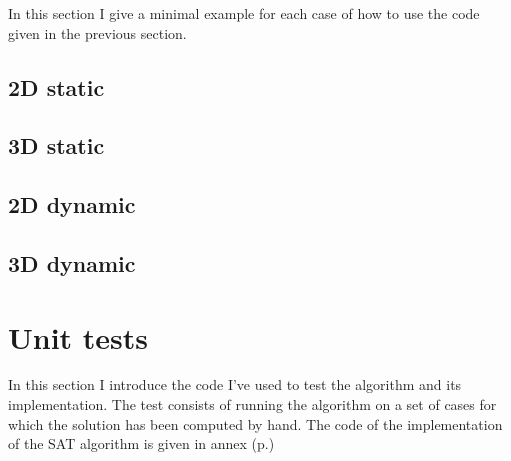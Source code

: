\documentclass[12pt, a4paper]{article}
\begin{document}
In this section I give a minimal example for each case of how to use the code given in the previous section.

\subsection{2D static}

\begin{scriptsize}
\begin{ttfamily}

\end{ttfamily}
\end{scriptsize}

\subsection{3D static}

\begin{scriptsize}
\begin{ttfamily}

\end{ttfamily}
\end{scriptsize}

\subsection{2D dynamic}

\begin{scriptsize}
\begin{ttfamily}

\end{ttfamily}
\end{scriptsize}

\subsection{3D dynamic}

\begin{scriptsize}
\begin{ttfamily}

\end{ttfamily}
\end{scriptsize}

\section{Unit tests}

In this section I introduce the code I've used to test the algorithm and its implementation. The test consists of running the algorithm on a set of cases for which the solution has been computed by hand. The code of the implementation of the SAT algorithm is given in annex (p.\pageref{sat_implementation})\\
\end{document}
